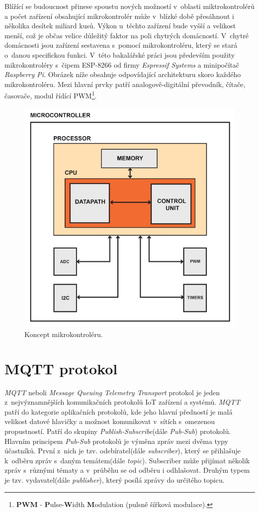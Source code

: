 Blížící se budoucnost přinese spoustu nových možností v~oblasti miktrokontrolérů a počet zařízení obsahující mikrokontrolér může v~blízké době přesáhnout i několika desítek miliard kusů.
Výkon u~těchto zařízení bude vyšší a velikost menší, což je občas velice důležitý faktor na poli chytrých domácností.
V~chytré domácnosti jsou zařízení sestavena s~pomocí mikrokontroléru, který se stará o~danou specifickou funkci. V~této bakalářské práci jsou především použity mikrokontroléry s~čipem ESP-8266 od firmy \emph{Espressif Systems}
a minipočítač \emph{Raspberry Pi}. Obrázek níže obsahuje odpovídající architekturu skoro každého mikrokontroléru.
Mezi hlavní prvky patří analogově-digitální převodník, čítače, časovače, modul řídící PWM\footnote{\textbf{PWM} - \textbf{P}ulse-\textbf{W}idth \textbf{M}odulation (pulsně šířková modulace).}.

\begin{figure}[hbt]
  \centering
  \includegraphics[width=.6 \linewidth]{obrazky-figures/mcu.jpeg}
  \caption{
    Koncept mikrokontroléru.~\cite{mcu:info}
  }
  \label{figure:mcu}
\end{figure}

\newpage

\section{MQTT protokol}
\label{terminy:mqtt}

\emph{MQTT} neboli \emph{Message Queuing Telemetry Transport} protokol je jeden z~nejvýznamnějších komunikačních protokolů IoT zařízení a systémů.
\emph{MQTT} patří do kategorie aplikačních protokolů, kde jeho hlavní předností je malá velikost datové hlavičky a možnost komunikovat v~sítích s~omezenou propustností.
Patří do skupiny \emph{Publish-Subscribe}(dále \emph{Pub-Sub}) protokolů.
Hlavním principem \emph{Pub-Sub} protokolů je výměna zpráv mezi dvěma typy účastníků. První z~nich je tzv. odebíratel(dále \emph{subscriber}),
který se přihlašuje k~odběru zpráv s~daným temátem(dále \emph{topic}).
Subscriber může přijímat několik zpráv s~různými tématy a v~průběhu se od odběru i odhlašovat. Druhým typem je tzv. vydavatel(dále \emph{publisher}), který posílá zprávy do určitého
topicu.~\cite{mqtt:info}

